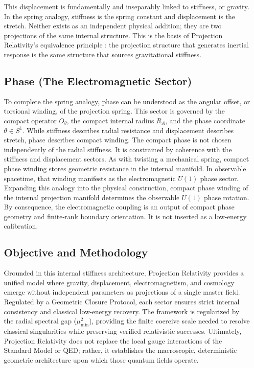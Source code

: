 \documentclass[11pt]{article}
\begin{document}
This displacement is fundamentally and inseparably linked to stiffness, or gravity. In the spring analogy, stiffness is the spring constant and displacement is the stretch. Neither exists as an independent physical addition; they are two projections of the same internal structure. This is the basis of Projection Relativity's equivalence principle \cite{Einstein1911}: the projection structure that generates inertial response is the same structure that sources gravitational stiffness.

\subsection{Phase (The Electromagnetic Sector)}

To complete the spring analogy, phase can be understood as the angular offset, or torsional winding, of the projection spring. This sector is governed by the compact operator \(O_\theta\), the compact internal radius \(R_A\), and the phase coordinate \(\theta\in S^1\). While stiffness describes radial resistance and displacement describes stretch, phase describes compact winding. The compact phase is not chosen independently of the radial stiffness. It is constrained by coherence with the stiffness and displacement sectors. As with twisting a mechanical spring, compact phase winding stores geometric resistance in the internal manifold. In observable spacetime, that winding manifests as the electromagnetic \(U(1)\) phase sector. Expanding this analogy into the physical construction, compact phase winding of the internal projection manifold determines the observable \(U(1)\) phase rotation. By consequence, the electromagnetic coupling is an output of compact phase geometry and finite-rank boundary orientation. It is not inserted as a low-energy calibration.

\subsection{Objective and Methodology}
Grounded in this internal stiffness architecture, Projection Relativity provides a unified model where gravity, displacement, electromagnetism, and cosmology emerge without independent parameters as projections of a single master field. Regulated by a Geometric Closure Protocol, each sector ensures strict internal consistency and classical low-energy recovery. The framework is regularized by the radial spectral gap ($\mu_{\min}^2$), providing the finite coercive scale needed to resolve classical singularities while preserving verified relativistic successes. Ultimately, Projection Relativity does not replace the local gauge interactions of the Standard Model or QED; rather, it establishes the macroscopic, deterministic geometric architecture upon which those quantum fields operate.
\end{document}
